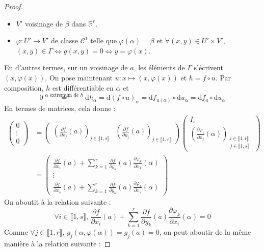 \begin{proof}
\begin{itemize}
      \item $V'$ voisinage de $\beta$ dans $\mathbb{R}^r$.
      \item $\varphi : U' \rightarrow V'$ de classe $\mathcal{C}^1$ telle que $\varphi(\alpha) = \beta$ et $\forall (x, y) \in U' \times V'$, $(x, y) \in \Gamma \iff g(x, y) = 0 \iff y = \varphi(x)$.
    \end{itemize}
    En d'autres termes, sur un voisinage de $a$, les éléments de $\Gamma$ s'écrivent $(x, \varphi(x))$. On pose maintenant $u : x \mapsto (x, \varphi(x))$ et $h = f \circ u$. Par composition, $h$ est différentiable en $\alpha$ et
    \[ 0 \overset{\alpha \text{ extremum de } h}{=} \mathrm{d}h_\alpha = \mathrm{d}(f \circ u)_\alpha = \mathrm{d}f_{u(\alpha)} \circ \mathrm{d}u_\alpha = \mathrm{d}f_a \circ \mathrm{d}u_\alpha \]
    En termes de matrices, cela donne :
    \begin{align*}
      \begin{pmatrix} 0 \\ \vdots \\ 0 \end{pmatrix} &= \begin{pmatrix} \left( \frac{\partial f}{\partial x_j}(a) \right)_{j \in \llbracket 1, s \rrbracket} & \left( \frac{\partial f}{\partial y_j}(a) \right)_{j \in \llbracket 1, r \rrbracket} \end{pmatrix} \begin{pmatrix} I_s \\ \left( \frac{\partial \varphi_i}{\partial x_j}(\alpha) \right)_{\substack{i \in \llbracket 1, r \rrbracket \\ j \in \llbracket 1, s \rrbracket}} \end{pmatrix} \\
      &= \begin{pmatrix} \frac{\partial f}{\partial x_1}(a) + \sum_{k=1}^r \frac{\partial f}{\partial y_k}(a) \frac{\partial \varphi_k}{\partial x_1}(\alpha) \\ \vdots \\ \frac{\partial f}{\partial x_s}(a) + \sum_{k=1}^r \frac{\partial f}{\partial y_k}(a) \frac{\partial \varphi_k}{\partial x_s}(\alpha) \end{pmatrix}
    \end{align*}
    On aboutit à la relation suivante :
    \[ \forall i \in \llbracket 1, s \rrbracket, \, \frac{\partial f}{\partial x_i}(a) + \sum_{k=1}^r \frac{\partial f}{\partial y_k}(a) \frac{\partial \varphi_k}{\partial x_i}(\alpha) = 0 \tag{$**$} \]
    Comme $\forall j \in \llbracket 1, r \rrbracket$, $g_j(\alpha, \varphi(\alpha)) = g_j(a) = 0$, on peut aboutir de la même manière à la relation suivante :

\end{proof}
